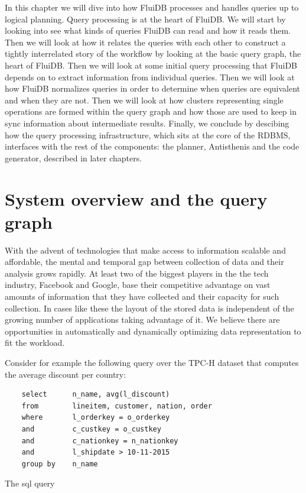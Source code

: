
In this chapter we will dive into how FluiDB processes and handles
queries up to logical planning. Query processing is at the heart of
FluiDB. We will start by looking into see what kinds of queries FluiDB
can read and how it reads them. Then we will look at how it relates
the queries with each other to construct a tightly interrelated story
of the workflow by looking at the basic query graph, the heart of
FluiDB. Then we will look at some initial query processing that FluiDB
depends on to extract information from individual queries. Then we
will look at how FluiDB normalizes queries in order to determine when
queries are equivalent and when they are not. Then we will look at how
clusters representing single operations are formed within the query
graph and how those are used to keep in sync information about
intermediate results. Finally, we conclude by descibing how the query
processing infrastructure, which sits at the core of the RDBMS,
interfaces with the rest of the components: the planner, Antisthenis
and the code generator, described in later chapters.

\section{System overview and the query graph}
\label{sec:optimizer_system_overview}
With the advent of technologies that make access to information
scalable and affordable, the mental and temporal gap between
collection of data and their analysis grows rapidly. At least two of
the biggest players in the the tech industry, Facebook and Google,
base their competitive advantage on vast amounts of information that
they have collected and their capacity for such collection. In cases
like these the layout of the stored data is independent of the growing
number of applications taking advantage of it. We believe there are
opportunities in automatically and dynamically optimizing data
representation to fit the workload.

Consider for example the following query over the TPC-H dataset that
computes the average discount per country:

\begin{listing}[p]
  \begin{verbatim}
    select      n_name, avg(l_discount)
    from        lineitem, customer, nation, order
    where       l_orderkey = o_orderkey
    and         c_custkey = o_custkey
    and         c_nationkey = n_nationkey
    and         l_shipdate > 10-11-2015
    group by    n_name
  \end{verbatim}
  \caption{The sql query}
\end{listing}

